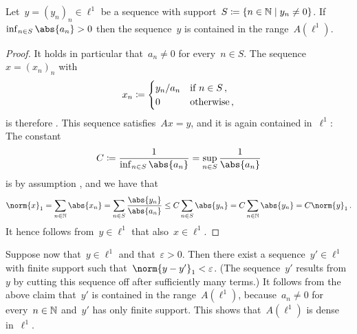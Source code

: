 \begin{claim}
  \label{sequence in image}
  Let~$y = (y_n)_n \in \ell^1$ be a sequence with support~$S \defined \{n \in \Natural \suchthat y_n \neq 0\}$.
  If~$\inf_{n \in S} \abs{a_n} > 0$ then the sequence~$y$ is contained in the range~$A(\ell^1)$.
\end{claim}

\begin{proof}
  It holds in particular that~$a_n \neq 0$ for every~$n \in S$.
  The sequence~$x = (x_n)_n$ with
  \[
              x_n
    \coloneqq  \begin{cases}
                y_n / a_n & \text{if~$n \in S$} \,, \\
                0         & \text{otherwise}  \,,
              \end{cases}
  \]
  is therefore {\welldef}.
  This sequence satisfies~$Ax = y$, and it is again contained in~$\ell^1$:
  The constant
  \[
              C
    \defined  \frac{1}{\inf_{n \in S} \abs{a_n}}
    =         \sup_{n \in S} \frac{1}{\abs{a_n}}
  \]
  is by assumption {\welldef}, and we have that
  \[
          \norm{x}_1
    =     \sum_{n \in \Natural} \abs{x_n}
    =     \sum_{n \in S} \frac{\abs{y_n}}{\abs{a_n}}
    \leq  C \sum_{n \in S} \abs{y_n}
    =     C \sum_{n \in \Natural} \abs{y_n}
    =     C \norm{y}_1 \,.
  \]
  It hence follows from~$y \in \ell^1$ that also~$x \in \ell^1$.
\end{proof}


Suppose now that~$y \in \ell^1$ and that~$\varepsilon > 0$.
Then there exist a sequence~$y' \in \ell^1$ with finite support such that~$\norm{y - y'}_1 < \varepsilon$.
(The sequence~$y'$ results from~$y$ by cutting this sequence off after sufficiently many terms.)
It follows from the above claim that~$y'$ is contained in the range~$A(\ell^1)$, because~$a_n \neq 0$ for every~$n \in \mathbb{N}$ and~$y'$ has only finite support.
This shows that~$A(\ell^1)$ is dense in~$\ell^1$.





\subsection{}

